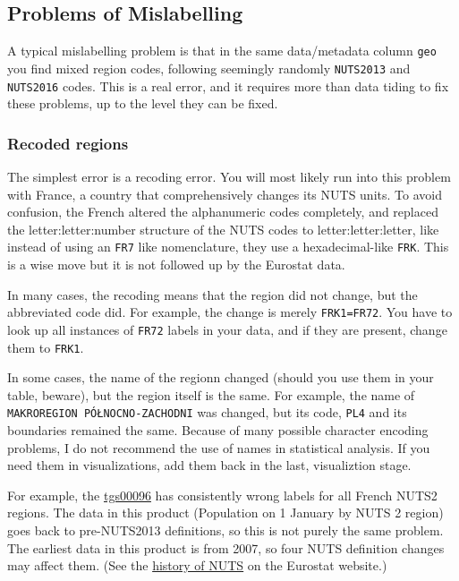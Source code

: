 \documentclass[]{article}
\begin{document}
\hypertarget{problems-of-mislabelling}{%
\subsection{Problems of Mislabelling}\label{problems-of-mislabelling}}

A typical mislabelling problem is that in the same data/metadata column
\texttt{geo} you find mixed region codes, following seemingly randomly
\texttt{NUTS2013} and \texttt{NUTS2016} codes. This is a real error, and
it requires more than data tiding to fix these problems, up to the level
they can be fixed.

\hypertarget{recoded-regions}{%
\subsubsection{Recoded regions}\label{recoded-regions}}

The simplest error is a recoding error. You will most likely run into
this problem with France, a country that comprehensively changes its
NUTS units. To avoid confusion, the French altered the alphanumeric
codes completely, and replaced the letter:letter:number structure of the
NUTS codes to letter:letter:letter, like instead of using an
\texttt{FR7} like nomenclature, they use a hexadecimal-like
\texttt{FRK}. This is a wise move but it is not followed up by the
Eurostat data.

In many cases, the recoding means that the region did not change, but
the abbreviated code did. For example, the change is merely
\texttt{FRK1=FR72}. You have to look up all instances of \texttt{FR72}
labels in your data, and if they are present, change them to
\texttt{FRK1}.

In some cases, the name of the regionn changed (should you use them in
your table, beware), but the region itself is the same. For example, the
name of \texttt{MAKROREGION\ PÓŁNOCNO-ZACHODNI} was changed, but its
code, \texttt{PL4} and its boundaries remained the same. Because of many
possible character encoding problems, I do not recommend the use of
names in statistical analysis. If you need them in visualizations, add
them back in the last, visualiztion stage.

For example, the
\href{https://ec.europa.eu/eurostat/web/products-datasets/product?code=tgs00096}{tgs00096}
has consistently wrong labels for all French NUTS2 regions. The data in
this product (Population on 1 January by NUTS 2 region) goes back to
pre-NUTS2013 definitions, so this is not purely the same problem. The
earliest data in this product is from 2007, so four NUTS definition
changes may affect them. (See the
\href{https://ec.europa.eu/eurostat/web/nuts/history}{history of NUTS}
on the Eurostat website.)
\end{document}
